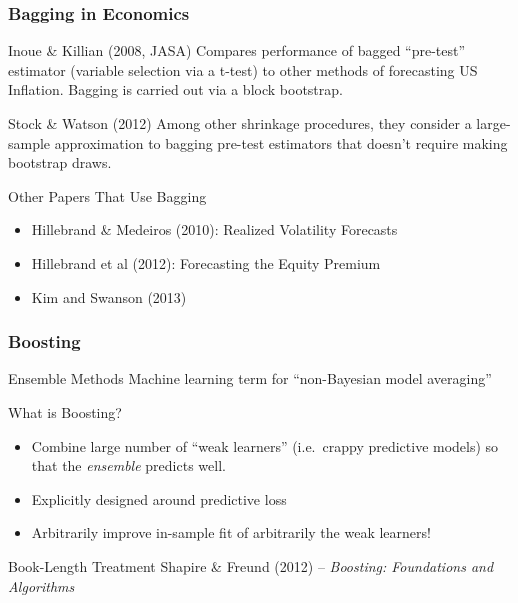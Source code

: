 \documentclass[handout]{beamer}
\begin{document}
\begin{frame}
	\frametitle{Bagging in Economics}
	\begin{block}
		{Inoue \& Killian (2008, JASA)}
		Compares performance of bagged ``pre-test'' estimator (variable selection via a t-test) to other methods of forecasting US Inflation. Bagging is carried out via a block bootstrap.
	\end{block}
	\begin{block}
		{Stock \& Watson (2012)}
		Among other shrinkage procedures, they consider a large-sample approximation to bagging pre-test estimators that doesn't require making bootstrap draws.
	\end{block}
	\begin{block}
		{Other Papers That Use Bagging}
		\begin{itemize}
			\item Hillebrand \& Medeiros (2010): Realized Volatility Forecasts
			\item Hillebrand et al (2012): Forecasting the Equity Premium
			\item \alert{Kim and Swanson (2013)}
		\end{itemize}
	\end{block}
\end{frame}
\begin{frame}
	\frametitle{Boosting}
	\begin{block}
		{Ensemble Methods}
		Machine learning term for ``non-Bayesian model averaging''
	\end{block}
	\begin{block}
		{What is Boosting?}
		\begin{itemize}
			\item Combine large number of ``weak learners'' (i.e.\ crappy predictive models) so that the \emph{ensemble} predicts well.
			\item Explicitly designed around predictive loss
			\item Arbitrarily improve in-sample fit of arbitrarily the weak learners!
		\end{itemize}
	\end{block}
	\begin{block}
		{Book-Length Treatment}
		Shapire \& Freund (2012) -- \emph{Boosting: Foundations and Algorithms}
	\end{block}
\end{frame}
\end{document}
